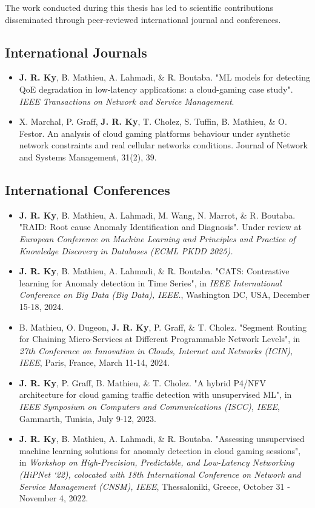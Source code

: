 The work conducted during this thesis has led to scientific contributions disseminated through peer-reviewed international journal and conferences.

\subsection*{International Journals}

\begin{itemize}
    \item \textbf{J. R. Ky}, B. Mathieu, A. Lahmadi, \& R. Boutaba. "ML models for detecting QoE degradation in low-latency applications: a cloud-gaming case study". \textit{IEEE Transactions on Network and Service Management}.
    \item X. Marchal, P. Graff, \textbf{J. R. Ky}, T. Cholez, S. Tuffin, B. Mathieu, \& O. Festor. An analysis of cloud gaming platforms behaviour under synthetic network constraints and real cellular networks conditions. Journal of Network and Systems Management, 31(2), 39.
\end{itemize}


\subsection*{International Conferences}

\begin{itemize}
    \item \textbf{J. R. Ky}, B. Mathieu, A. Lahmadi, M. Wang, N. Marrot, \& R. Boutaba. "RAID: Root cause Anomaly Identification and Diagnosis". Under review at \textit{European Conference on Machine Learning and Principles and Practice of Knowledge Discovery in Databases (ECML PKDD 2025).}
    
    \item \textbf{J. R. Ky}, B. Mathieu, A. Lahmadi, \& R. Boutaba. "CATS: Contrastive learning for Anomaly detection in Time Series", in \textit{IEEE International Conference on Big Data (Big Data), IEEE.}, Washington DC, USA, December 15-18, 2024.
    
    \item B. Mathieu, O. Dugeon, \textbf{J. R. Ky}, P. Graff, \& T. Cholez. "Segment Routing for Chaining Micro-Services at Different Programmable Network Levels", in \textit{27th Conference on Innovation in Clouds, Internet and Networks (ICIN), IEEE}, Paris, France, March 11-14, 2024.

    \item \textbf{J. R. Ky}, P. Graff, B. Mathieu, \& T. Cholez. "A hybrid P4/NFV architecture for cloud gaming traffic detection with unsupervised ML", in \textit{IEEE Symposium on Computers and Communications (ISCC), IEEE}, Gammarth, Tunisia, July 9-12, 2023.

    \item \textbf{J. R. Ky}, B. Mathieu, A. Lahmadi, \& R. Boutaba. "Assessing unsupervised machine learning solutions for anomaly detection in cloud gaming sessions", in \textit{Workshop on High-Precision, Predictable, and Low-Latency Networking (HiPNet ‘22), colocated with 18th International Conference on Network and Service Management (CNSM), IEEE}, Thessaloniki, Greece, October 31 - November 4, 2022. 
\end{itemize}